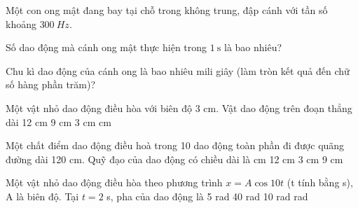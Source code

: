 \begin{vidu}
\end{vidu}
\begin{vidu}
Một con ong mật đang bay tại chỗ trong không trung, đập cánh với tần số khoảng $300\ Hz$.  
\begin{vdc}
Số dao động mà cánh ong mật thực hiện trong $1 \mathrm{~s}$ là bao nhiêu?
\end{vdc}
\begin{vdc}
Chu kì dao động của cánh ong là bao nhiêu mili giây (làm tròn kết quả đến chữ số hàng phần trăm)?
\end{vdc}
\end{vidu} 


\begin{vidu}%
Một vật nhỏ dao động điều hòa với biên độ 3 cm. Vật dao động trên đoạn thẳng dài
\choice
{12 cm}
{9 cm}
{3 cm}
{ cm}
\end{vidu} 
\begin{vidu}
Một chất điểm dao động điều hoà trong 10 dao động toàn phần đi được quãng đường dài 120 cm. Quỹ đạo của dao động có chiều dài là
\choice
{ cm}
{12 cm}
{3 cm}
{9 cm}
\loigiai{
}
\end{vidu} %
\begin{vidu}%
Một vật nhỏ dao động điều hòa theo phương trình $x = A\cos 10t$ (t tính bằng s), A là biên độ. Tại $t = 2$ s, pha của dao động là
\choice
{5 rad}
{40 rad}
{10 rad}
{ rad}
\end{vidu} %

